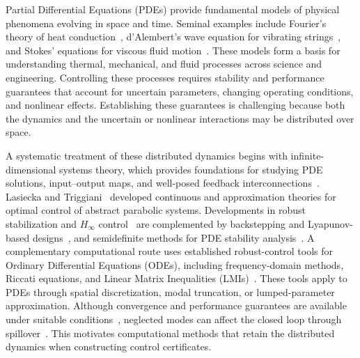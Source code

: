 Partial Differential Equations (PDEs) provide fundamental models of
physical phenomena evolving in space and time. Seminal examples include
Fourier's theory of heat conduction~\cite{fourier1822chaleur},
d'Alembert's wave equation for vibrating strings~\cite{dalembert1747vibration},
and Stokes' equations for viscous fluid motion~\cite{stokes1880friction}.
These models form a basis for understanding thermal, mechanical, and
fluid processes across science and engineering.
Controlling these processes requires stability and performance guarantees
that account for uncertain parameters, changing operating conditions, and
nonlinear effects.
Establishing these guarantees is challenging because both the dynamics
and the uncertain or nonlinear interactions may be distributed over space.

A systematic treatment of these distributed dynamics begins with
infinite-dimensional systems theory, which provides foundations for
studying PDE solutions, input--output maps, and well-posed feedback
interconnections~\cite{curtain1978infinite,curtain1995introduction,staffans2005wellposed}.
Lasiecka and Triggiani~\cite{lasiecka2000parabolic} developed continuous
and approximation theories for optimal control of abstract parabolic
systems.
Developments in robust stabilization and $H_\infty$
control~\cite{curtain1986robust,vankeulen1993hinfinity} are complemented by
backstepping and Lyapunov-based
designs~\cite{krstic2008boundary,fridman2012sampled}, and semidefinite
methods for PDE stability analysis~\cite{valmorbida2016pdesdp}.
A complementary computational route uses established robust-control tools
for Ordinary Differential Equations (ODEs), including frequency-domain
methods, Riccati equations, and Linear Matrix Inequalities
(LMIs)~\cite{Francis1987Course,doyle1989statespace,boyd1994lmi,zhou1996robust,packard1993complex}.
These tools apply to PDEs through spatial discretization, modal
truncation, or lumped-parameter approximation. Although convergence and
performance guarantees are available under suitable
conditions~\cite{morris2001hinfinityapproximation}, neglected modes can
affect the closed loop through spillover~\cite{balas1978modal}. This
motivates computational methods that retain the distributed dynamics
when constructing control certificates.

